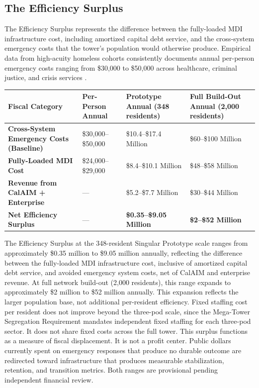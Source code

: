 \documentclass[12pt, letterpaper]{article}
\begin{document}
\subsection{The Efficiency Surplus}

The Efficiency Surplus represents the difference between the fully-loaded MDI infrastructure cost, including amortized capital debt service, and the cross-system emergency costs that the tower's population would otherwise produce. Empirical data from high-acuity homeless cohorts consistently documents annual per-person emergency costs ranging from \$30,000 to \$50,000 across healthcare, criminal justice, and crisis services \citep{culhane_metraux_hadley_2002, larimer_2009}.

\begin{table}[H]
\centering
\begin{tabularx}{\textwidth}{@{}lXXX@{}}
\toprule
\textbf{Fiscal Category} & \textbf{Per-Person Annual} & \textbf{Prototype Annual (348 residents)} & \textbf{Full Build-Out Annual (2,000 residents)} \\
\midrule
\textbf{Cross-System Emergency Costs (Baseline)} & \$30,000--\$50,000 & \$10.4--\$17.4 Million & \$60--\$100 Million \\
\textbf{Fully-Loaded MDI Cost} & \$24,000--\$29,000 & \$8.4--\$10.1 Million & \$48--\$58 Million \\
\textbf{Revenue from CalAIM + Enterprise} & --- & \$5.2--\$7.7 Million & \$30--\$44 Million \\
\textbf{Net Efficiency Surplus} & --- & \textbf{\$0.35--\$9.05 Million} & \textbf{\$2--\$52 Million} \\
\bottomrule
\end{tabularx}
\end{table}

The Efficiency Surplus at the 348-resident Singular Prototype scale ranges from approximately \$0.35 million to \$9.05 million annually, reflecting the difference between the fully-loaded MDI infrastructure cost, inclusive of amortized capital debt service, and avoided emergency system costs, net of CalAIM and enterprise revenue. At full network build-out (2,000 residents), this range expands to approximately \$2 million to \$52 million annually. This expansion reflects the larger population base, not additional per-resident efficiency. Fixed staffing cost per resident does not improve beyond the three-pod scale, since the Mega-Tower Segregation Requirement mandates independent fixed staffing for each three-pod sector. It does not share fixed costs across the full tower. This surplus functions as a measure of fiscal displacement. It is not a profit center. Public dollars currently spent on emergency responses that produce no durable outcome are redirected toward infrastructure that produces measurable stabilization, retention, and transition metrics. Both ranges are provisional pending independent financial review.
\end{document}
